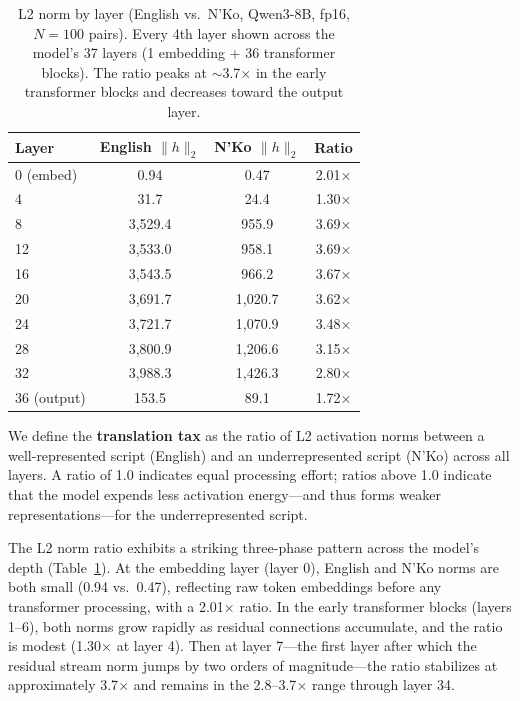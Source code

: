 \documentclass[11pt]{article}
\begin{document}
\begin{table}[t]
\centering
\small
\begin{tabular}{lccc}
\toprule
\textbf{Layer} & \textbf{English $\|h\|_2$} & \textbf{N'Ko $\|h\|_2$} & \textbf{Ratio} \\
\midrule
0 (embed) & 0.94 & 0.47 & 2.01$\times$ \\
4 & 31.7 & 24.4 & 1.30$\times$ \\
8 & 3{,}529.4 & 955.9 & 3.69$\times$ \\
12 & 3{,}533.0 & 958.1 & 3.69$\times$ \\
16 & 3{,}543.5 & 966.2 & 3.67$\times$ \\
20 & 3{,}691.7 & 1{,}020.7 & 3.62$\times$ \\
24 & 3{,}721.7 & 1{,}070.9 & 3.48$\times$ \\
28 & 3{,}800.9 & 1{,}206.6 & 3.15$\times$ \\
32 & 3{,}988.3 & 1{,}426.3 & 2.80$\times$ \\
36 (output) & 153.5 & 89.1 & 1.72$\times$ \\
\bottomrule
\end{tabular}
\caption{L2 norm by layer (English vs.\ N'Ko, Qwen3-8B, fp16, $N=100$ pairs). Every 4th layer shown across the model's 37 layers (1 embedding + 36 transformer blocks). The ratio peaks at $\sim$3.7$\times$ in the early transformer blocks and decreases toward the output layer.}
\label{tab:l2-norm}
\end{table}

We define the \textbf{translation tax} as the ratio of L2 activation norms between a well-represented script (English) and an underrepresented script (N'Ko) across all layers.
A ratio of 1.0 indicates equal processing effort; ratios above 1.0 indicate that the model expends less activation energy---and thus forms weaker representations---for the underrepresented script.

The L2 norm ratio exhibits a striking three-phase pattern across the model's depth (Table~\ref{tab:l2-norm}).
At the embedding layer (layer 0), English and N'Ko norms are both small (0.94 vs.\ 0.47), reflecting raw token embeddings before any transformer processing, with a 2.01$\times$ ratio.
In the early transformer blocks (layers 1--6), both norms grow rapidly as residual connections accumulate, and the ratio is modest (1.30$\times$ at layer 4).
Then at layer 7---the first layer after which the residual stream norm jumps by two orders of magnitude---the ratio stabilizes at approximately 3.7$\times$ and remains in the 2.8--3.7$\times$ range through layer 34.
\end{document}
